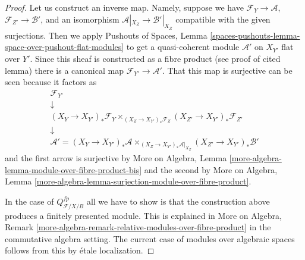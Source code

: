 \begin{proof}
Let us construct an inverse map. Namely, suppose we have
$\mathcal{F}_Y \to \mathcal{A}$,
$\mathcal{F}_{Z'} \to \mathcal{B}'$, and an isomorphism
$\mathcal{A}|_{X_Z} \to \mathcal{B}'|_{X_Z}$
compatible with the given surjections.
Then we apply Pushouts of Spaces, Lemma
\ref{spaces-pushouts-lemma-space-over-pushout-flat-modules}
to get a quasi-coherent module $\mathcal{A}'$ on $X_{Y'}$
flat over $Y'$. Since this sheaf is constructed as a fibre product
(see proof of cited lemma) there is a canonical map
$\mathcal{F}_{Y'} \to \mathcal{A}'$. That this map is surjective
can be seen because it factors as
$$
\begin{matrix}
\mathcal{F}_{Y'} \\
\downarrow \\
(X_Y \to X_{Y'})_*\mathcal{F}_Y
\times_{(X_Z \to X_{Y'})_*\mathcal{F}_Z}
(X_{Z'} \to X_{Y'})_*\mathcal{F}_{Z'} \\
\downarrow \\
\mathcal{A}' =
(X_Y \to X_{Y'})_*\mathcal{A}
\times_{(X_Z \to X_{Y'})_*\mathcal{A}|_{X_Z}}
(X_{Z'} \to X_{Y'})_*\mathcal{B}'
\end{matrix}
$$
and the first arrow is surjective by
More on Algebra, Lemma \ref{more-algebra-lemma-module-over-fibre-product-bis}
and the second by
More on Algebra, Lemma
\ref{more-algebra-lemma-surjection-module-over-fibre-product}.

\medskip\noindent
In the case of $Q^{fp}_{\mathcal{F}/X/B}$ all we have to show is that
the construction above produces a finitely presented module.
This is explained in
More on Algebra, Remark
\ref{more-algebra-remark-relative-modules-over-fibre-product}
in the commutative algebra setting. The current case of modules
over algebraic spaces follows from this
by \'etale localization.
\end{proof}

